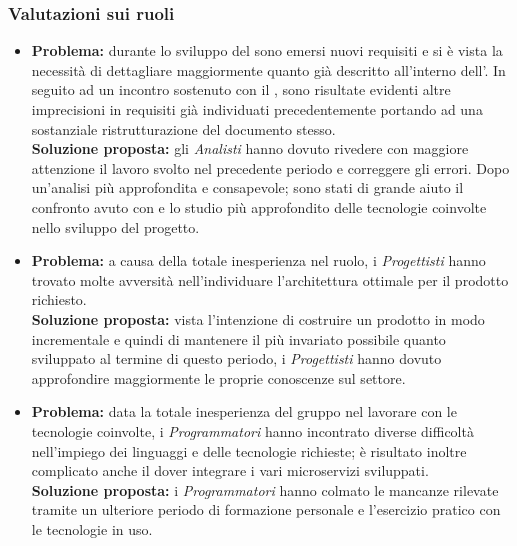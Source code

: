 \subsubsection{Valutazioni sui ruoli}
\begin{itemize}
	\item \textbf{Problema:} durante lo sviluppo del  sono emersi nuovi requisiti e si è vista la necessità di dettagliare maggiormente quanto già descritto all'interno dell'{\AdR}. In seguito ad un incontro sostenuto con il {\CR}, sono risultate evidenti altre imprecisioni in requisiti già individuati precedentemente portando ad una sostanziale ristrutturazione del documento stesso.\\
	\textbf{Soluzione proposta:} gli \textit{Analisti} hanno dovuto rivedere con maggiore attenzione il lavoro svolto nel precedente periodo e correggere gli errori. Dopo un'analisi più approfondita e consapevole; sono stati di grande aiuto il confronto avuto con {\Proponente} e lo studio più approfondito delle tecnologie coinvolte nello sviluppo del progetto.
\end{itemize}
\begin{itemize}
	\item \textbf{Problema:} a causa della totale inesperienza nel ruolo, i \textit{Progettisti} hanno trovato molte avversità nell'individuare l'architettura ottimale per il prodotto richiesto.\\
	\textbf{Soluzione proposta:} vista l'intenzione di costruire un prodotto in modo incrementale e quindi di mantenere il più invariato possibile quanto sviluppato al termine di questo periodo, i \textit{Progettisti} hanno dovuto approfondire maggiormente le proprie conoscenze sul settore.
\end{itemize}
\begin{itemize}
	\item \textbf{Problema:} data la totale inesperienza del gruppo nel lavorare con le tecnologie coinvolte, i \textit{Programmatori} hanno incontrato diverse difficoltà nell'impiego dei linguaggi e delle tecnologie richieste; è risultato inoltre complicato anche il dover integrare i vari microservizi sviluppati.\\
	\textbf{Soluzione proposta:} i \textit{Programmatori} hanno colmato le mancanze rilevate tramite un ulteriore periodo di formazione personale e l'esercizio pratico con le tecnologie in uso.
\end{itemize}